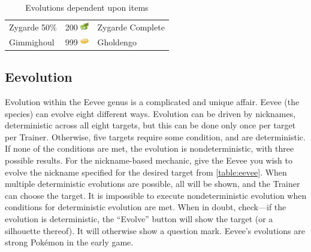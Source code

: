 \begin{table}
\begin{tabular}{lll}
    Zygarde 50\% & 200 \includegraphics[width=1em,height=1em]{images/zygardecell.png} & Zygarde Complete \\
    Gimmighoul & 999 \includegraphics[width=1em,height=1em]{images/gcoin.png} & Gholdengo \\
  \end{tabular}
  \caption{Evolutions dependent upon items\label{table:itemevolutions}}
\end{table}

\subsection{Eevolution}
\begin{figure}
\end{figure}
Evolution within the Eevee genus is a complicated and unique affair.
Eevee (the species) can evolve eight different ways.
Evolution can be driven by nicknames, deterministic across all eight targets,
  but this can be done only once per target per Trainer.
Otherwise, five targets require some condition, and are deterministic.
If none of the conditions are met, the evolution is nondeterministic,
  with three possible results.
For the nickname-based mechanic, give the Eevee you wish to evolve the nickname
  specified for the desired target from \autoref{table:eevee}.
When multiple deterministic evolutions are possible, all will be shown,
  and the Trainer can choose the target.
It is impossible to execute nondeterministic evolution when conditions for deterministic evolution are met.
When in doubt, check---if the evolution is deterministic, the ``Evolve'' button will show the target (or a silhouette thereof).
It will otherwise show a question mark.
Eevee's evolutions are strong Pokémon in the early game.
